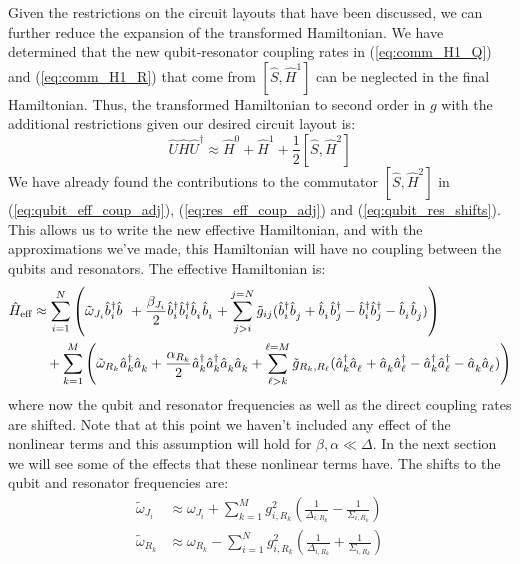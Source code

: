 Given the restrictions on the circuit layouts that have been discussed, we can further reduce the expansion of the transformed Hamiltonian. We have determined that the new qubit-resonator coupling rates in (\ref{eq:comm_H1_Q}) and (\ref{eq:comm_H1_R}) that come from $[\hat{S},\hat{H}^1]$ can be neglected in the final Hamiltonian. Thus, the transformed Hamiltonian to second order in $g$ with the additional restrictions given our desired circuit layout is:
\begin{equation}
    \hat{U} \hat{H} \hat{U}^\dag \approx \hat{H}^0 + \hat{H}^1 + \frac{1}{2}[\hat{S}, \hat{H}^2]
\end{equation}
We have already found the contributions to the commutator $[\hat{S}, \hat{H}^2]$ in (\ref{eq:qubit_eff_coup_adj}), (\ref{eq:res_eff_coup_adj}) and (\ref{eq:qubit_res_shifts}). This allows us to write the new effective Hamiltonian, and with the approximations we've made, this Hamiltonian will have no coupling between the qubits and resonators. The effective Hamiltonian is:
\begin{align}
\begin{split}\label{eq:eff_ham}
    \hat{H}_{\text{eff}} &\approx \sum_{i=1}^N \left(  \tilde{\omega}_{J_i}\opbd_i\opb + \frac{\beta_{J_i}}{2}\opbd_i\opbd_i\opb_i\opb_i  + \sum_{j > i}^{j=N} \tilde{g}_{ij} (\opbd_i\opb_j + \opb_i\opbd_j - \opbd_i\opbd_j - \opb_i\opb_j) \right) \\
    &\quad + \sum_{k=1}^M \left( \tilde{\omega}_{R_k}\opad_k\opa_k + \frac{\alpha_{R_k}}{2} \opad_k\opad_k\opa_k\opa_k + \sum_{\ell > k}^{\ell=M} \tilde{g}_{R_k,R_\ell} (\opad_k\opa_\ell + \opa_k\opad_\ell - \opad_k\opad_\ell - \opa_k\opa_\ell) \right)
\end{split}
\end{align}
where now the qubit and resonator frequencies as well as the direct coupling rates are shifted. Note that at this point we haven't included any effect of the nonlinear terms and this assumption will hold for $\beta,\alpha \ll \Delta$. In the next section we will see some of the effects that these nonlinear terms have. The shifts to the qubit and resonator frequencies are:
\begin{align}
    \tilde{\omega}_{J_i} &\approx \omega_{J_i} + \sum_{k=1}^M g^2_{i,R_k}\left( \frac{1}{\Delta_{i,R_k}} - \frac{1}{\Sigma_{i,R_k}} \right) \label{eq:eff_qubit_freq} \\
    \tilde{\omega}_{R_k} &\approx \omega_{R_k} - \sum_{i=1}^N g^2_{i,R_k}\left( \frac{1}{\Delta_{i,R_k}} + \frac{1}{\Sigma_{i,R_k}} \right) \label{eq:eff_res_freq}
\end{align}
